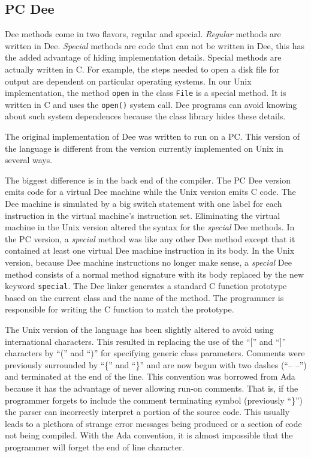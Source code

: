 \subsection{PC Dee}

Dee methods come in two flavors, regular and special.  {\em Regular}
methods are written in Dee.  {\em Special} methods are code that can
not be written in Dee, this has the added advantage of hiding
implementation details. Special methods are actually written in C.
For example, the steps needed to open a disk file for output are
dependent on particular operating systems.  In our Unix
implementation, the method {\tt open} in the class {\tt File} is a
special method.  It is written in C and uses the {\tt open()} system
call.  Dee programs can avoid knowing about such system dependences
because the class library hides these details.

The original implementation of Dee was written to run on a PC.  This
version of the language is different from the version currently
implemented on Unix in several ways.

The biggest difference is in the back end of the compiler.  The PC Dee
version emits code for a virtual Dee machine while the Unix version
emits C code.  The Dee machine is simulated by a big switch statement
with one label for each instruction in the virtual machine's
instruction set.  Eliminating the virtual machine in the Unix version
altered the syntax for the {\em special} Dee methods.  In the PC
version, a {\em special} method was like any other Dee method except
that it contained at least one virtual Dee machine instruction in its
body.  In the Unix version, because Dee machine instructions no longer
make sense, a {\em special} Dee method consists of a normal method
signature with its body replaced by the new keyword {\tt special}.
The Dee linker generates a standard C function prototype based on the
current class and the name of the method.  The programmer is
responsible for writing the C function to match the prototype.

The Unix version of the language has been slightly altered to avoid
using international characters.  This resulted in replacing the use of
the ``['' and ``]'' characters by ``('' and ``)'' for specifying
generic class parameters.  Comments were previously surrounded by
``\{'' and ``\}'' and are now begun with two dashes (``-- --'') and
terminated at the end of the line.  This convention was borrowed from
Ada because it has the advantage of never allowing run-on comments.
That is, if the programmer forgets to include the comment terminating
symbol (previously ``\}'') the parser can incorrectly interpret a
portion of the source code.  This usually leads to a plethora of
strange error messages being produced or a section of code not being
compiled.  With the Ada convention, it is almost impossible that the
programmer will forget the end of line character.

